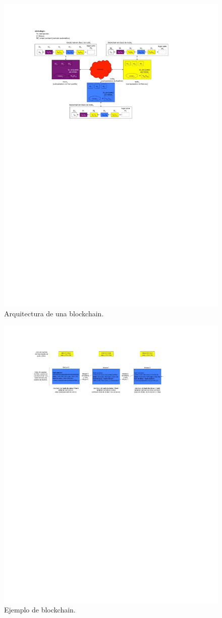 \documentclass[12pt]{report} %
\begin{document}
\begin{figure}
\centering
\includegraphics[width=0.85\columnwidth]{arqbc.pdf}
\caption{Arquitectura de una blockchain.}
\label{arqbc}
\end{figure} 


\begin{figure}
\centering
\includegraphics[width=0.85\columnwidth]{imagenbcej.pdf}
\caption{Ejemplo de blockchain.}
\label{imagenbcej}
\end{figure} 
\end{document}
